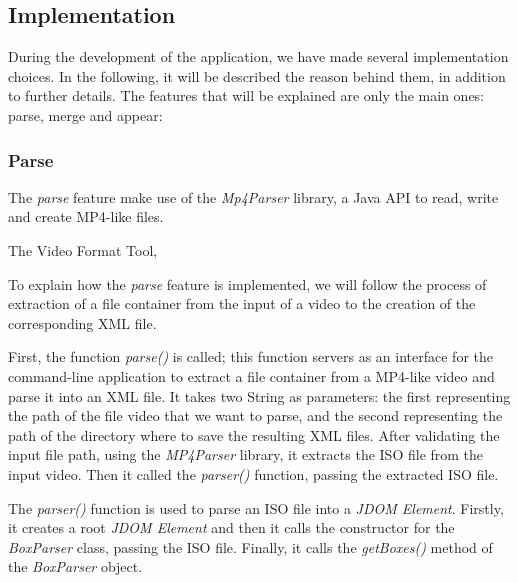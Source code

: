 \subsection{Implementation} 
 
During the development of the application, we have made several implementation choices. In the following, it will be described the reason behind them, in addition to further details. The features that will be explained are only the main ones: parse, merge and appear:

\subsubsection{Parse}

The \emph{parse} feature make use of the \emph{Mp4Parser} library, a Java API to read, write and create MP4-like files.

The Video Format Tool, 

To explain how the \emph{parse} feature is implemented, we will follow the process of extraction of a file container from the input of a video to the creation of the corresponding XML file.

First, the function \emph{parse()} is called; this function servers as an interface for the command-line application to extract a file container from a MP4-like video and parse it into an XML file. It takes two String as parameters: the first representing the path of the file video that we want to parse, and the second representing the path of the directory where to save the resulting XML files. After validating the input file path, using the \emph{MP4Parser} library, it extracts the ISO file from the input video. Then it called the \emph{parser()} function, passing the extracted ISO file.

The \emph{parser()} function is used to parse an ISO file into a \emph{JDOM Element}. Firstly, it creates a root \emph{JDOM Element} and then it calls the constructor for the \emph{BoxParser} class, passing the ISO file. Finally, it calls the \emph{getBoxes()} method of the \emph{BoxParser} object.

